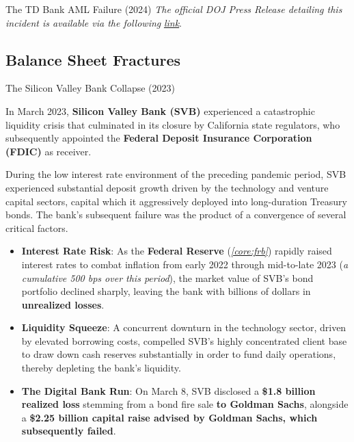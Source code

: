 \documentclass[10pt]{article}
\begin{document}
\begin{core}[label=core:td_bank_aml]{The TD Bank AML Failure (2024)}
      \textit{The official DOJ Press Release detailing this incident is available via the following} \href{ https://www.justice.gov/criminal/case/united-states-america-v-td-bank-na#:~:text=Throughout%20this%20time%2C%20TD%20Bank%20intentionally%20excluded,to%20approximately%20%2418.3%20trillion%20in%20transaction%20activity.}{\textit{link}}.

    \end{core}

  \subsection{Balance Sheet Fractures}

    \begin{core}[label=core:svb_collapse]{The Silicon Valley Bank Collapse (2023)}

      In March 2023, \textbf{Silicon Valley Bank (SVB)} experienced a catastrophic liquidity crisis that culminated in its closure by California state regulators, who subsequently appointed the \textbf{Federal Deposit Insurance Corporation (FDIC)} as receiver.

      During the low interest rate environment of the preceding pandemic period, SVB experienced substantial deposit growth driven by the technology and venture capital sectors, capital which it aggressively deployed into long-duration Treasury bonds. The bank's subsequent failure was the product of a convergence of several critical factors.

      \begin{itemize}

        \item \textbf{Interest Rate Risk}: As the \textbf{Federal Reserve} (\textit{\autoref{core:frb}}) rapidly raised interest rates to combat inflation from early 2022 through mid-to-late 2023 (\textit{a cumulative 500 bps over this period}), the market value of SVB's bond portfolio declined sharply, leaving the bank with billions of dollars in \textbf{unrealized losses}.

        \item \textbf{Liquidity Squeeze}: A concurrent downturn in the technology sector, driven by elevated borrowing costs, compelled SVB's highly concentrated client base to draw down cash reserves substantially in order to fund daily operations, thereby depleting the bank's liquidity.

        \item \textbf{The Digital Bank Run}: On March 8, SVB disclosed a \textbf{\$1.8 billion realized loss} stemming from a bond fire sale \textbf{to Goldman Sachs}, alongside a \textbf{\$2.25 billion capital raise advised by Goldman Sachs, which subsequently failed}. 


\end{itemize}
\end{core}
\end{document}
